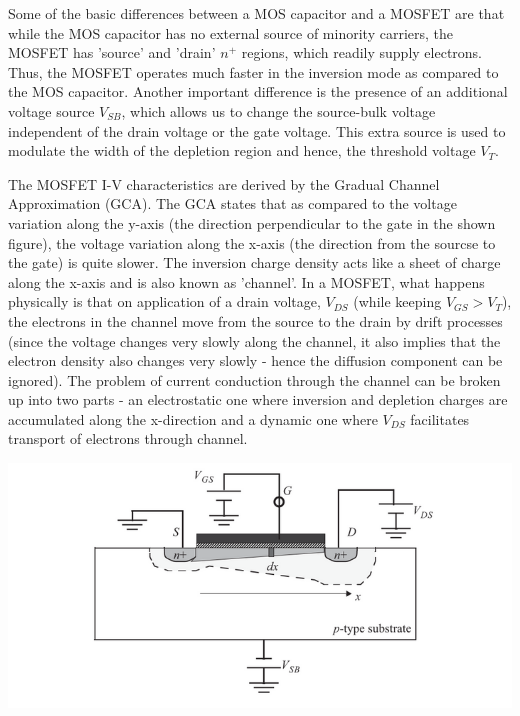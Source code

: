 \documentclass[12 pt]{article}
\begin{document}
Some of the basic differences between a MOS capacitor and a MOSFET are that while the MOS capacitor has no external source of minority carriers, the MOSFET has 'source' and 'drain' $n^{+}$ regions, which readily supply electrons. Thus, the MOSFET operates much faster in the inversion mode as compared to the MOS capacitor. Another important difference is the presence of an additional voltage source $V_{SB}$, which allows us to change the source-bulk voltage independent of the drain voltage or the gate voltage. This extra source is used to modulate the width of the depletion region and hence, the threshold voltage $V_{T}$. \par

The MOSFET I-V characteristics are derived by the Gradual Channel Approximation (GCA). The GCA states that as compared to the voltage variation along the y-axis (the direction perpendicular to the gate in the shown figure), the voltage variation along the x-axis (the direction from the sourcse to the gate) is quite slower. The inversion charge density acts like a sheet of charge along the x-axis and is also known as 'channel'. In a MOSFET, what happens physically is that on application of a drain voltage, $V_{DS}$ (while keeping $V_{GS} > V_{T}$), the electrons in the channel move from the source to the drain by drift processes (since the voltage changes very slowly along the channel, it also implies that the electron density also changes very slowly - hence the diffusion component can be ignored). The problem of current conduction through the channel can be broken up into two parts - an electrostatic one where inversion and depletion charges are accumulated along the x-direction and a dynamic one where $V_{DS}$ facilitates transport of electrons through channel. \newline

\par
\begin{center}
    \includegraphics{MOSFET_2.png}
\end{center}
\par
\end{document}
